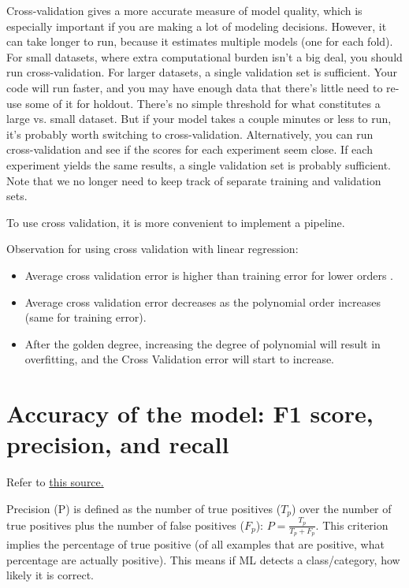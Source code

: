 \documentclass[12pt]{report}
\begin{document}
Cross-validation gives a more accurate measure of model quality, which is especially important if you are making a lot of modeling decisions. However, it can take longer to run, because it estimates multiple models (one for each fold). For small datasets, where extra computational burden isn't a big deal, you should run cross-validation. For larger datasets, a single validation set is sufficient. Your code will run faster, and you may have enough data that there's little need to re-use some of it for holdout. There's no simple threshold for what constitutes a large vs. small dataset. But if your model takes a couple minutes or less to run, it's probably worth switching to cross-validation. Alternatively, you can run cross-validation and see if the scores for each experiment seem close. If each experiment yields the same results, a single validation set is probably sufficient. Note that we no longer need to keep track of separate training and validation sets.

To use cross validation, it is more convenient to implement a pipeline.

Observation for using cross validation with linear regression:
\begin{itemize}
  \item Average cross validation error is higher than training error for lower orders .
  \item Average cross validation error decreases as the polynomial order increases (same for training error).
  \item After the golden degree, increasing the degree of polynomial will result in overfitting, and the Cross Validation error will start to increase.
\end{itemize}

\section{Accuracy of the model: F1 score, precision, and recall}
Refer to \href{https://scikit-learn.org/stable/auto_examples/model_selection/plot_precision_recall.html#precision-recall}{this source.}

Precision (P) is defined as the number of true positives ($T_p$) over the number of true positives plus the number of false positives ($F_p$): $P = \frac{T_p}{T_p + F_p} $. This criterion implies the percentage of true positive (of all examples that are positive, what percentage are actually positive). This means if ML detects a class/category, how likely it is correct.
\end{document}
